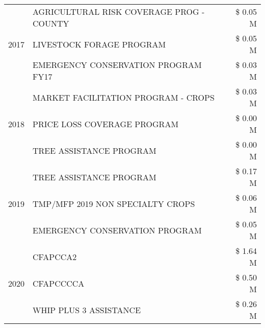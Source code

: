 \begin{tabular}{llr}
\cline{1-3}
\multirow[t]{3}{*}{2017} & AGRICULTURAL RISK COVERAGE PROG - COUNTY & \$ 0.05 M \\
 & LIVESTOCK FORAGE PROGRAM & \$ 0.05 M \\
 & EMERGENCY CONSERVATION PROGRAM FY17 & \$ 0.03 M \\
\cline{1-3}
\multirow[t]{3}{*}{2018} & MARKET FACILITATION PROGRAM - CROPS & \$ 0.03 M \\
 & PRICE LOSS COVERAGE PROGRAM & \$ 0.00 M \\
 & TREE ASSISTANCE PROGRAM & \$ 0.00 M \\
\cline{1-3}
\multirow[t]{3}{*}{2019} & TREE ASSISTANCE PROGRAM & \$ 0.17 M \\
 & TMP/MFP 2019 NON SPECIALTY CROPS & \$ 0.06 M \\
 & EMERGENCY CONSERVATION PROGRAM & \$ 0.05 M \\
\cline{1-3}
\multirow[t]{3}{*}{2020} & CFAPCCA2 & \$ 1.64 M \\
 & CFAPCCCCA & \$ 0.50 M \\
 & WHIP PLUS 3 ASSISTANCE & \$ 0.26 M \\
\cline{1-3}
\bottomrule
\end{tabular}
